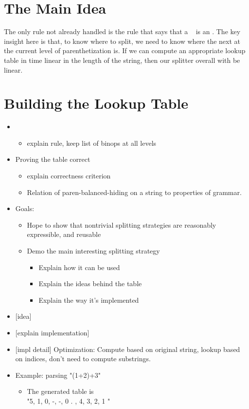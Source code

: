  \section{The Main Idea}
    The only rule not already handled is the rule that says that a ~ is an .  The key insight here is that, to know where to split, we need to know where the next \terminal{+} at the current level of parenthetization is.  If we can compute an appropriate lookup table in time linear in the length of the string, then our splitter overall with be linear.
    
  \section{Building the Lookup Table}
    
  \begin{itemize}
\item           \begin{itemize} \item  explain rule, keep list of binops at all levels \end{itemize} 
        \item  Proving the table correct 
          \begin{itemize} \item  explain correctness criterion 
          \item  Relation of paren-balanced-hiding on a string to properties of grammar. \end{itemize} \end{itemize}

  \begin{itemize} \item  Goals:
    \begin{itemize} \item  Hope to show that nontrivial splitting strategies are reasonably expressible, and reusable 
    \item  Demo the main interesting splitting strategy 
      \begin{itemize} \item  Explain how it can be used 
      \item  Explain the ideas behind the table 
      \item  Explain the way it's implemented \end{itemize} \end{itemize}
  
  \item  {}[idea] 
  \item  {}[explain implementation]
  \item  {}[impl detail] Optimization: Compute based on original string, lookup based on indices, don't need to compute substrings.
  \item  Example: parsing "(1+2)+3"
    \begin{itemize} \item  The generated table is  \\
      "5, 1, 0, -, -, 0 .
        , 4, 3, 2, 1
      "
\end{itemize} \end{itemize}